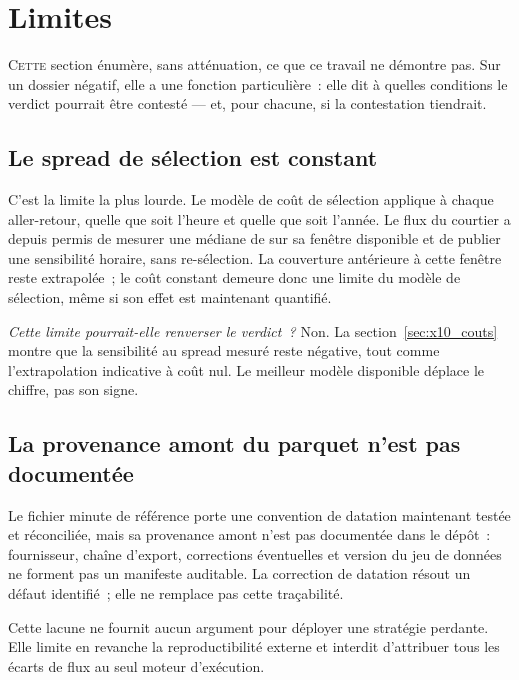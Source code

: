 \section{Limites}
\label{sec:x10_limites}

\lettrine[lines=2, findent=2pt, nindent=0pt]{C}{ette} section énumère, sans
atténuation, ce que ce travail ne démontre pas. Sur un dossier négatif, elle
a une fonction particulière~: elle dit à quelles conditions le verdict
pourrait être contesté --- et, pour chacune, si la contestation tiendrait.

\subsection{Le spread de sélection est constant}

C'est la limite la plus lourde. Le modèle de coût de sélection applique
\XTenSpreadUsd{} à chaque aller-retour, quelle que soit l'heure et quelle que
soit l'année. Le flux du courtier a depuis permis de mesurer une médiane de
\XTenSpreadMeasuredMedian{} sur sa fenêtre disponible et de publier une
sensibilité horaire, sans re-sélection. La couverture antérieure à cette
fenêtre reste extrapolée~; le coût constant demeure donc une limite du modèle
de sélection, même si son effet est maintenant quantifié.

\emph{Cette limite pourrait-elle renverser le verdict~?} Non. La
section~\ref{sec:x10_couts} montre que la sensibilité au spread mesuré reste
négative, tout comme l'extrapolation indicative à coût nul. Le meilleur
modèle disponible déplace le chiffre, pas son signe.

\subsection{La provenance amont du parquet n'est pas documentée}

Le fichier minute de référence porte une convention de datation maintenant
testée et réconciliée, mais sa provenance amont n'est pas documentée dans le
dépôt~: fournisseur, chaîne d'export, corrections éventuelles et version du
jeu de données ne forment pas un manifeste auditable. La correction de
datation résout un défaut identifié~; elle ne remplace pas cette traçabilité.

Cette lacune ne fournit aucun argument pour déployer une stratégie perdante.
Elle limite en revanche la reproductibilité externe et interdit d'attribuer
tous les écarts de flux au seul moteur d'exécution.

